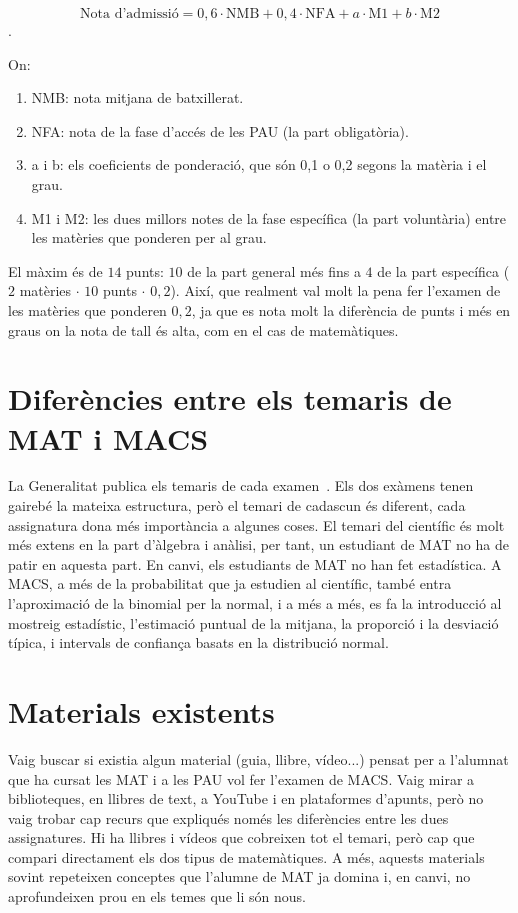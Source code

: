 $$\mbox{Nota d'admissió} = 0,6 \cdot \mbox{NMB} + 0,4 \cdot \mbox{NFA} + a \cdot \mbox{M1} + b \cdot \mbox{M2} $$.

On:
\begin{enumerate}
 \item NMB: nota mitjana de batxillerat.
 \item NFA: nota de la fase d'accés de les PAU (la part obligatòria).
 \item a i b: els coeficients de ponderació, que són 0,1 o 0,2 segons la matèria i el grau.
 \item M1 i M2: les dues millors notes de la fase específica (la part voluntària) entre les matèries que ponderen per al grau.
\end{enumerate}
El màxim és de $14$ punts: $10$ de la part general més fins a $4$ de la part específica ($2$ matèries $\cdot$ $10$ punts $\cdot$ $0,2$). Així, que realment val molt la pena fer l'examen de les matèries que ponderen $0,2$, ja que es nota molt la diferència de punts i més en graus on la nota de tall és alta, com en el cas de matemàtiques.

\vspace*{1truecm}

\section{Diferències entre els temaris de MAT i MACS}
La Generalitat publica els temaris de cada examen~\cite{Temari-mat,Temari-macs}. Els dos exàmens tenen gairebé la mateixa estructura, però el temari de cadascun és diferent, cada assignatura dona més importància a algunes coses. El temari del científic és molt més extens en la part d'àlgebra i anàlisi, per tant, un estudiant de MAT no ha de patir en aquesta part. En canvi, els estudiants de MAT no han fet estadística. A MACS, a més de la probabilitat que ja estudien al científic, també entra l'aproximació de la binomial per la normal, i a més a més, es fa la introducció al mostreig estadístic, l'estimació puntual de la mitjana, la proporció i la desviació típica, i intervals de confiança basats en la distribució normal.


\section{Materials existents}
Vaig buscar si existia algun material (guia, llibre, vídeo...) pensat per a l'alumnat que ha cursat les MAT i a les PAU vol fer l'examen de MACS. Vaig mirar a biblioteques, en llibres de text, a YouTube i en plataformes d'apunts, però no vaig trobar cap recurs que expliqués només les diferències entre les dues assignatures. Hi ha llibres i vídeos que cobreixen tot el temari, però cap que compari directament els dos tipus de matemàtiques. A més, aquests materials sovint repeteixen conceptes que l'alumne de MAT ja domina i, en canvi, no aprofundeixen prou en els temes que li són nous.
